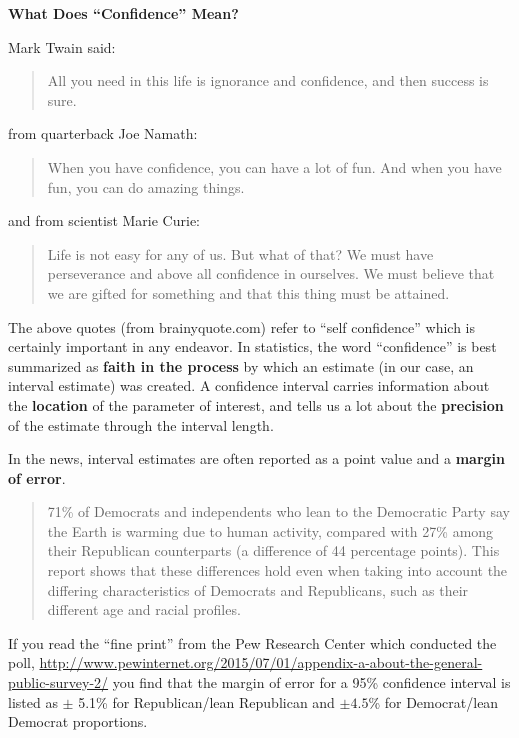 
\def\theTopic{Confidence }
\def\dayNum{7}

\begin{center}
\vspace*{-.2in}
{\bf {\large What Does ``Confidence'' Mean?}}\\
\end{center}

Mark Twain said:
\begin{quotation}
All you need in this life is ignorance and confidence, and then
success is sure.   
\end{quotation}

 from quarterback Joe Namath:
\begin{quotation}
When you have confidence, you can have a lot of fun. And when you have fun, you can do amazing things.  
\end{quotation}

and from scientist Marie Curie:
\begin{quotation}
  Life is not easy for any of us. But what of that? We must have
  perseverance and above all confidence in ourselves. We must believe
  that we are gifted for something and that this thing must be
  attained. 
\end{quotation}

The above quotes (from brainyquote.com) refer to  ``self confidence''
which is certainly important in any endeavor.
In statistics, the word ``confidence'' is best summarized as {\bf
  faith in the process} by which an estimate (in our case, an interval
estimate) was created.  A confidence interval carries information
about the {\bf location} of the parameter of interest, and tells us a lot
about the {\bf precision} of the estimate through the interval
length. 


In the news, interval estimates are often reported as a point value
and a {\bf margin of error}. 

\begin{quotation}
  71\% of Democrats and independents who lean to the Democratic Party
  say the Earth is warming due to human activity, compared with 27\%
  among their Republican counterparts (a difference of 44 percentage
  points). This report shows that these differences hold even when
  taking into account the differing characteristics of Democrats and
  Republicans, such as their different age and racial profiles. 
\end{quotation}

  If you read the ``fine print'' from the  Pew Research Center which
  conducted the poll,
\url{http://www.pewinternet.org/2015/07/01/appendix-a-about-the-general-public-survey-2/}
you find that the margin of error for a 95\% confidence interval is
listed as $\pm$ 5.1\% for Republican/lean Republican and $\pm 4.5$\%
for Democrat/lean Democrat proportions.

